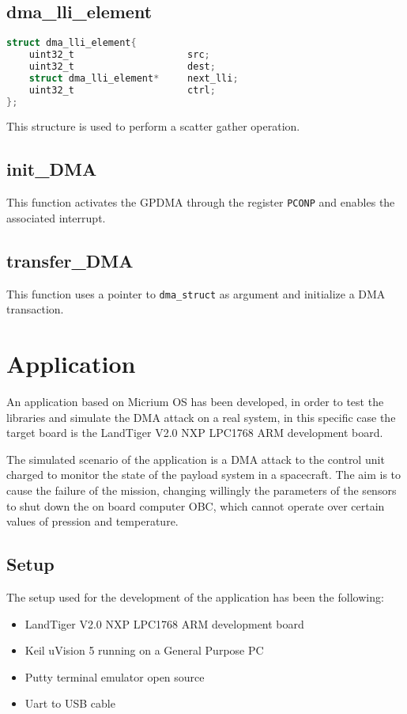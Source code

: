 \subsection{dma\_lli\_element}
\begin{lstlisting}[language= C, caption = DMA transfer struct]
struct dma_lli_element{
	uint32_t 					src;
	uint32_t 					dest;
	struct dma_lli_element* 	next_lli;
	uint32_t					ctrl;
};
\end{lstlisting} \label{dma_lli_struct}
This structure is used to perform a scatter gather operation. 

\subsection{init\_DMA}
This function activates the GPDMA through the register \texttt{PCONP} and enables the associated interrupt.

\subsection{transfer\_DMA}
This function uses a pointer to \texttt{dma\_struct} as argument and initialize a DMA transaction. 


\section{Application}

An application based on Micrium OS has been developed, in order to test the libraries and simulate the DMA attack on a real system, in this specific case the target board is the LandTiger V2.0 NXP LPC1768 ARM development board.

The simulated scenario of the application is a DMA attack to the control unit charged to monitor the state of the payload system in a spacecraft. The aim is to cause the failure of the mission, changing willingly the parameters of the sensors to shut down the on board computer OBC, which cannot operate over certain values of pression and temperature.

\subsection{Setup}
The setup used for the development of the application has been the following:
\begin{itemize}
    \item LandTiger V2.0 NXP LPC1768 ARM development board
    \item Keil uVision 5  running on a General Purpose PC
    \item Putty terminal emulator open source
    \item Uart to USB cable 
\end{itemize}


